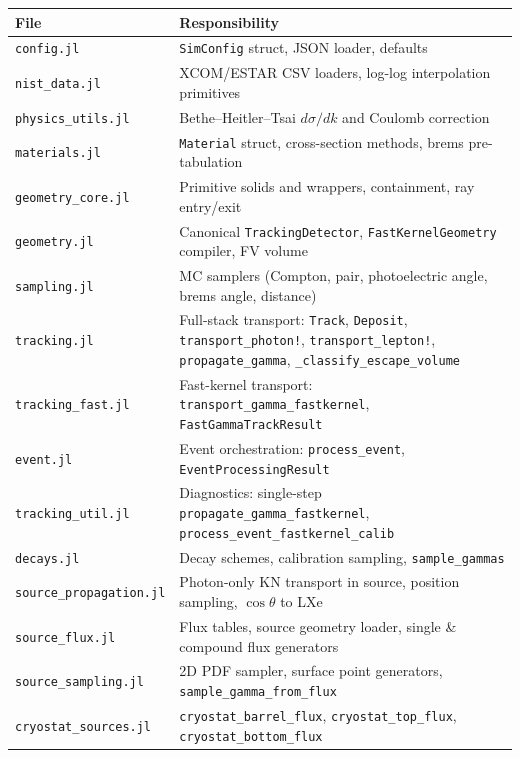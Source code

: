 \documentclass[11pt]{article}
\begin{document}
\begin{table}[h]
\centering
\begin{tabular}{ll}
\toprule
File & Responsibility \\
\midrule
\texttt{config.jl}             & \texttt{SimConfig} struct, JSON loader, defaults \\
\texttt{nist\_data.jl}         & XCOM/ESTAR CSV loaders, log-log interpolation primitives \\
\texttt{physics\_utils.jl}     & Bethe--Heitler--Tsai $d\sigma/dk$ and Coulomb correction \\
\texttt{materials.jl}          & \texttt{Material} struct, cross-section methods, brems pre-tabulation \\
\texttt{geometry\_core.jl}     & Primitive solids and wrappers, containment, ray entry/exit \\
\texttt{geometry.jl}           & Canonical \texttt{TrackingDetector}, \texttt{FastKernelGeometry} compiler, FV volume \\
\texttt{sampling.jl}           & MC samplers (Compton, pair, photoelectric angle, brems angle, distance) \\
\texttt{tracking.jl}           & Full-stack transport: \texttt{Track}, \texttt{Deposit}, \texttt{transport\_photon!}, \texttt{transport\_lepton!}, \texttt{propagate\_gamma}, \texttt{\_classify\_escape\_volume} \\
\texttt{tracking\_fast.jl}     & Fast-kernel transport: \texttt{transport\_gamma\_fastkernel}, \texttt{FastGammaTrackResult} \\
\texttt{event.jl}              & Event orchestration: \texttt{process\_event}, \texttt{EventProcessingResult} \\
\texttt{tracking\_util.jl}     & Diagnostics: single-step \texttt{propagate\_gamma\_fastkernel}, \texttt{process\_event\_fastkernel\_calib} \\
\texttt{decays.jl}             & Decay schemes, calibration sampling, \texttt{sample\_gammas} \\
\texttt{source\_propagation.jl}& Photon-only KN transport in source, position sampling, $\cos\theta$ to LXe \\
\texttt{source\_flux.jl}       & Flux tables, source geometry loader, single \& compound flux generators \\
\texttt{source\_sampling.jl}   & 2D PDF sampler, surface point generators, \texttt{sample\_gamma\_from\_flux} \\
\texttt{cryostat\_sources.jl}  & \texttt{cryostat\_barrel\_flux}, \texttt{cryostat\_top\_flux}, \texttt{cryostat\_bottom\_flux} \\

\end{tabular}
\end{table}
\end{document}
